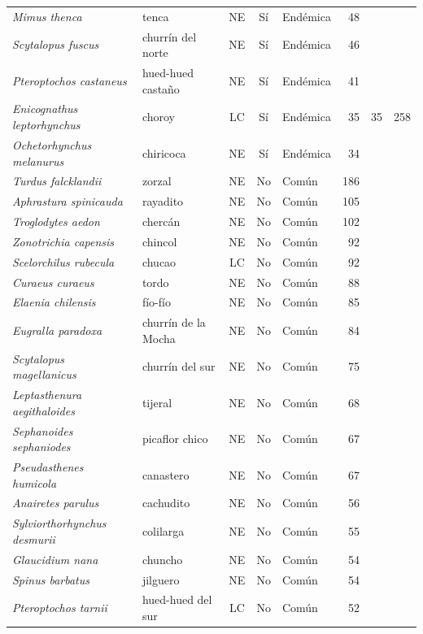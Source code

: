 {\begin{longtable}{@{}l l c c l r r r@{}}
    \textit{Mimus thenca} & tenca & NE & Sí & Endémica & 48 &  &  \\
    \textit{Scytalopus fuscus} & churrín del norte & NE & Sí & Endémica & 46 &  &  \\
    \textit{Pteroptochos castaneus} & hued-hued castaño & NE & Sí & Endémica & 41 &  &  \\
    \textit{Enicognathus leptorhynchus} & choroy & LC & Sí & Endémica & 35 & 35 & 258 \\
    \textit{Ochetorhynchus melanurus} & chiricoca & NE & Sí & Endémica & 34 &  &  \\
    \textit{Turdus falcklandii} & zorzal & NE & No & Común & 186 &  &  \\
    \textit{Aphrastura spinicauda} & rayadito & NE & No & Común & 105 &  &  \\
    \textit{Troglodytes aedon} & chercán & NE & No & Común & 102 &  &  \\
    \textit{Zonotrichia capensis} & chincol & NE & No & Común & 92 &  &  \\
    \textit{Scelorchilus rubecula} & chucao & LC & No & Común & 92 &  &  \\
    \textit{Curaeus curaeus} & tordo & NE & No & Común & 88 &  &  \\
    \textit{Elaenia chilensis} & fío-fío & NE & No & Común & 85 &  &  \\
    \textit{Eugralla paradoxa} & churrín de la Mocha & NE & No & Común & 84 &  &  \\
    \textit{Scytalopus magellanicus} & churrín del sur & NE & No & Común & 75 &  &  \\
    \textit{Leptasthenura aegithaloides} & tijeral & NE & No & Común & 68 &  &  \\
    \textit{Sephanoides sephaniodes} & picaflor chico & NE & No & Común & 67 &  &  \\
    \textit{Pseudasthenes humicola} & canastero & NE & No & Común & 67 &  &  \\
    \textit{Anairetes parulus} & cachudito & NE & No & Común & 56 &  &  \\
    \textit{Sylviorthorhynchus desmurii} & colilarga & NE & No & Común & 55 &  &  \\
    \textit{Glaucidium nana} & chuncho & NE & No & Común & 54 &  &  \\
    \textit{Spinus barbatus} & jilguero & NE & No & Común & 54 &  &  \\
    \textit{Pteroptochos tarnii} & hued-hued del sur & LC & No & Común & 52 &  &  \\

\end{longtable}}
